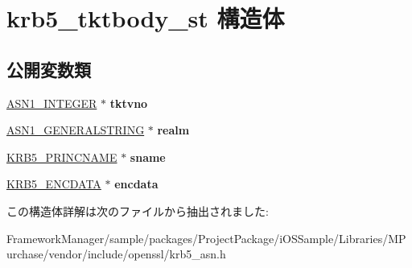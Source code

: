 \hypertarget{structkrb5__tktbody__st}{}\section{krb5\+\_\+tktbody\+\_\+st 構造体}
\label{structkrb5__tktbody__st}
\subsection*{公開変数類}
\begin{DoxyCompactItemize}
\item 
\hypertarget{structkrb5__tktbody__st_ab08375dff74a8c2325a6f513a57db966}{}\hyperlink{structasn1__string__st}{A\+S\+N1\+\_\+\+I\+N\+T\+E\+G\+E\+R} $\ast$ {\bfseries tktvno}\label{structkrb5__tktbody__st_ab08375dff74a8c2325a6f513a57db966}

\item 
\hypertarget{structkrb5__tktbody__st_afda45dfe18a1811139bec0b5ef92f279}{}\hyperlink{structasn1__string__st}{A\+S\+N1\+\_\+\+G\+E\+N\+E\+R\+A\+L\+S\+T\+R\+I\+N\+G} $\ast$ {\bfseries realm}\label{structkrb5__tktbody__st_afda45dfe18a1811139bec0b5ef92f279}

\item 
\hypertarget{structkrb5__tktbody__st_a2348d5ac085e82390778933a463d9333}{}\hyperlink{structkrb5__princname__st}{K\+R\+B5\+\_\+\+P\+R\+I\+N\+C\+N\+A\+M\+E} $\ast$ {\bfseries sname}\label{structkrb5__tktbody__st_a2348d5ac085e82390778933a463d9333}

\item 
\hypertarget{structkrb5__tktbody__st_af8a772eee7b3423d1d48926ca5dfea20}{}\hyperlink{structkrb5__encdata__st}{K\+R\+B5\+\_\+\+E\+N\+C\+D\+A\+T\+A} $\ast$ {\bfseries encdata}\label{structkrb5__tktbody__st_af8a772eee7b3423d1d48926ca5dfea20}

\end{DoxyCompactItemize}


この構造体詳解は次のファイルから抽出されました\+:\begin{DoxyCompactItemize}
\item 
Framework\+Manager/sample/packages/\+Project\+Package/i\+O\+S\+Sample/\+Libraries/\+M\+Purchase/vendor/include/openssl/krb5\+\_\+asn.\+h\end{DoxyCompactItemize}

